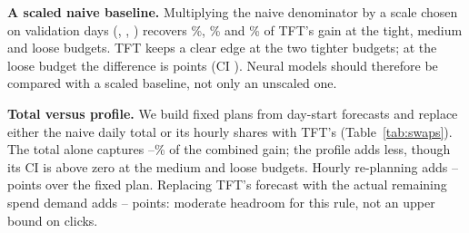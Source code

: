\documentclass[sigconf,nonacm]{acmart}
\begin{document}
\textbf{A scaled naive baseline.} Multiplying the naive denominator by a
scale chosen on validation days (, ,
) recovers \%, \%
and \% of TFT's gain at the tight, medium and loose
budgets. TFT keeps a clear edge at the two tighter budgets; at the loose
budget the difference is  points (CI ).
Neural models should therefore be compared with a scaled baseline, not only
an unscaled one.

\begin{table}[tb]
  \caption{Day-start plan swaps and the oracle, in points (95\% CIs).}
  \label{tab:swaps}
  \small\setlength{\tabcolsep}{3pt}
\end{table}

\textbf{Total versus profile.} We build fixed plans from day-start forecasts
and replace either the naive daily total or its hourly shares with TFT's
(Table~\ref{tab:swaps}). The total alone captures
--\% of the combined gain; the profile
adds less, though its CI is above zero at the medium and loose budgets. Hourly
re-planning adds -- points over the
fixed plan. Replacing TFT's forecast with the actual remaining spend demand
adds -- points: moderate headroom for this
rule, not an upper bound on clicks.
\end{document}
